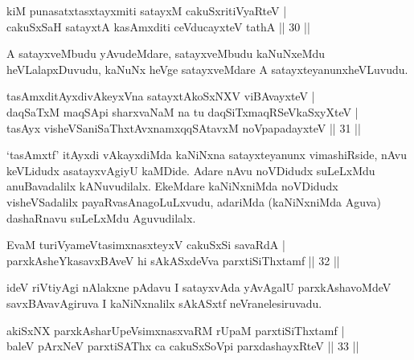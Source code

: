 
\begin{shl}
kiM punasatxtasxtayxmiti satayxM cakuSxritiVyaRteV | \\
cakuSxSaH satayxtA kasAmxditi ceVducayxteV tathA \hfill ||  30 || 
\end{shl}

\begin{artha} 
A satayxveMbudu yAvudeMdare, satayxveMbudu kaNuNx\break eMdu heVLalapxDuvudu, 
kaNuNx heVge satayxveMdare A satayxteyanunx\break heVLuvudu.
\end{artha}

\begin{shl}
tasAmxditAyxdivAkeyxVna satayxtA\s koSxNXV viBAvayxteV | \\
daqSaTxM maqSA\s pi sharxvaNaM na tu daqSiTxmaqRSeVkaSxyXteV | \\
tasAyx visheVSaniSaThxtAvxnamxqqSAtavxM noVpapadayxteV \hfill ||  31 || 
\end{shl}

\begin{artha} 
`tasAmxtf' itAyxdi vAkayxdiMda kaNiNxna satayxteyanunx vimashiRside, 
nAvu keVLidudx asatayxvAgiyU kaMDide. Adare nAvu noVDidudx suLeLxMdu 
anuBavadalilx kANuvudilalx. EkeMdare kaNiNxniMda noVDidudx 
visheVSadalilx payaRvasAnagoLuLxvudu, adariMda (kaNiNxniMda Aguva) 
dashaRnavu suLeLxMdu Aguvudilalx.
\end{artha}


\begin{shl}
EvaM turiVyameVtasimxnasxteyxV cakuSxSi savaRdA | \\
parxkAsheYkasavxBAveV hi sAkASxdeVva parxtiSiThxtamf \hfill ||  32 || 
\end{shl}

\begin{artha} 
ideV riVtiyAgi nAlakxne pAdavu I satayxvAda yAvAgalU parxkAshavoMdeV
savxBAvavAgiruva I kaNiNxnalilx sAkASxtf neVra\break nelesiruvadu.
\end{artha}


\begin{shl}
akiSxNX parxkAsharUpeV\s simxnasxvaRM rUpaM parxtiSiThxtamf | \\
baleV pArxNeV parxtiSAThx ca cakuSxSoV\s pi parxdashayxRteV \hfill ||  33 || 
\end{shl}

